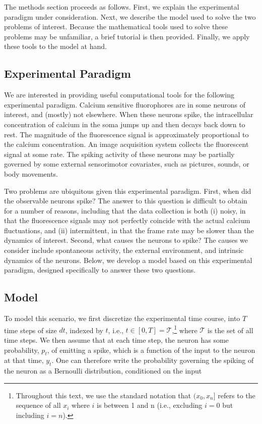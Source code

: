 %
%

The methods section proceeds as follows.  First, we explain the experimental paradigm under consideration. Next, we describe the model used to solve the two problems of interest.  Because the mathematical tools used to solve these problems may be unfamiliar, a brief tutorial is then provided.  Finally, we apply these tools to the model at hand.

\subsection{Experimental Paradigm} \label{sec:exp}

We are interested in providing useful computational tools for the following experimental paradigm.  Calcium sensitive fluorophores are in some neurons  of interest, and (mostly) not elsewhere.  When these neurons spike, the intracellular concentration of calcium in the soma jumps up and then decays back down to rest. The magnitude of the fluorescence signal is approximately proportional to the calcium concentration.  An image acquisition system collects the fluorescent signal at some rate. The spiking activity of these neurons may be partially governed by some external sensorimotor covariates, such as pictures, sounds, or body movements.

Two problems are ubiquitous given this experimental paradigm.  First, when did the observable neurons spike?  The answer to this question is difficult to obtain for a number of reasons, including that the data collection is both (i) noisy, in that the fluorescence signals may not perfectly coincide with the actual calcium fluctuations, and (ii) intermittent, in that the frame rate may be slower than the dynamics of interest.  Second, what causes the neurons to spike?  The causes we consider include spontaneous activity, the external environment, and intrinsic dynamics of the neurons.  Below, we develop a model based on this experimental paradigm, designed specifically to answer these two questions.

\subsection{Model} \label{sec:model}

To model this scenario, we first discretize the experimental time course, into $T$ time steps of size $dt$, indexed by $t$, i.e., $t \in [0,T] = \mathcal{T}$,\footnote{Throughout this text, we use the standard notation that $(x_0,x_n]$ refers to the sequence of all $x_i$ where $i$ is between 1 and n (i.e., excluding $i=0$ but including $i=n$).} where $\mathcal{T}$ is the set of all time steps.  We then assume that at each time step, the neuron has some probability, $p_t$, of emitting a spike, which is a function of the input to the neuron at that time, $y_t$.  One can therefore write the probability governing the spiking of the neuron as a Bernoulli distribution, conditioned on the input

